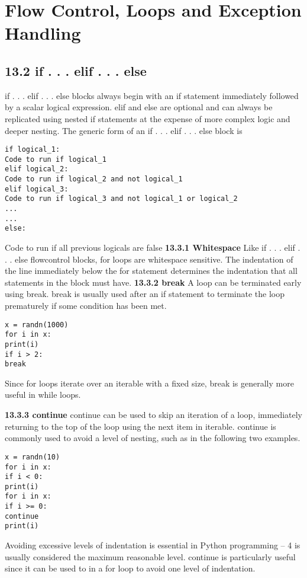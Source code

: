 \documentclass[KSmain.tex]{subfiles}
\begin{document}
 
\section{Flow Control, Loops and Exception Handling}
\subsection{13.2 if . . . elif . . . else}
if . . . elif . . . else blocks always begin with an if statement immediately followed by a scalar logical
expression. elif and else are optional and can always be replicated using nested if statements at the
expense of more complex logic and deeper nesting. The generic form of an if . . . elif . . . else block is

\begin{framed}
\begin{verbatim}
if logical_1:
Code to run if logical_1
elif logical_2:
Code to run if logical_2 and not logical_1
elif logical_3:
Code to run if logical_3 and not logical_1 or logical_2
...
...
else:
\end{verbatim}
\end{framed}
Code to run if all previous logicals are false
\newpage
\textbf{13.3.1 Whitespace}
Like if . . . elif . . . else flowcontrol blocks, for loops are whitespace sensitive. The indentation of the line
immediately below the for statement determines the indentation that all statements in the block must
have.
\textbf{13.3.2 break}
A loop can be terminated early using break. break is usually used after an if statement to terminate the
loop prematurely if some condition has been met.
\begin{framed}
\begin{verbatim}
x = randn(1000)
for i in x:
print(i)
if i > 2:
break
\end{verbatim}
\end{framed}
Since for loops iterate over an iterable with a fixed size, break is generally more useful in while loops.

\textbf{13.3.3 continue}
continue can be used to skip an iteration of a loop, immediately returning to the top of the loop using the
next item in iterable. continue is commonly used to avoid a level of nesting, such as in the following two
examples.
\begin{framed}
\begin{verbatim}
x = randn(10)
for i in x:
if i < 0:
print(i)
for i in x:
if i >= 0:
continue
print(i)
\end{verbatim}
\end{framed}
Avoiding excessive levels of indentation is essential in Python programming – 4 is usually considered the
maximum reasonable level. continue is particularly useful since it can be used to in a for loop to avoid
one level of indentation.
\newpage
\end{document}
